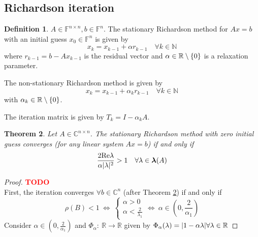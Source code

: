 \documentclass[12pt]{article}
\newcounter{lecture}
\newtheorem{theorem}{Theorem}[lecture]
\theoremstyle{definition}
\newtheorem{definition}[theorem]{Definition}
\theoremstyle{remark}
\numberwithin{equation}{section}
\newcommand{\F}{\mathbb{F}}
\newcommand{\R}{\mathbb{R}}
\newcommand{\C}{\mathbb{C}}
\newcommand{\N}{\mathbb{N}}
\renewcommand{\Re}{\textnormal{Re}}
\newcommand{\spectrum}[1]{\bm{\lambda}(#1)}
\newcommand{\TODO}[1][]{\textcolor{red}{\textbf{TODO\ifblank{#1}{}{:\ }#1}}\\}
\DeclarePairedDelimiter{\set}{\{}{\}}
\DeclarePairedDelimiter{\abs}{\lvert}{\rvert}
\begin{document}
\subsection*{Richardson iteration}
\begin{definition}
  $A \in \F^{n\times n}, b \in \F^n$. The stationary Richardson method for $Ax=b$ with an initial guess $x_0 \in \F^n$ is given by
  \begin{equation*}
    x_k = x_{k-1} + \alpha r_{k-1} \quad \forall k \in \N
  \end{equation*}
  where $r_{k-1} = b - Ax_{k-1}$ is the residual vector and $\alpha \in \R\setminus\set{0}$ is a relaxation parameter.

  The non-stationary Richardson method is given by
  \begin{equation*}
    x_k = x_{k-1} + \alpha_k r_{k-1} \quad \forall k \in \N
  \end{equation*}
  with $\alpha_k \in \R\setminus\set{0}$.

  The iteration matrix is given by $T_k = I - \alpha_k A$.
\end{definition}
\begin{theorem}
  \label{thm:5.7}
  Let $A \in \C^{n\times n}$. The stationary Richardson method with zero initial guess converges (for any linear system $Ax = b$) if and only if
  \begin{equation*}
    \frac{2 \Re \lambda}{\alpha |\lambda|^2} > 1 \quad \forall \lambda \in \spectrum{A}
  \end{equation*}
\end{theorem}
\begin{proof}
  \TODO
  First, the iteration converges $\forall b \in \C^n$ (after Theorem \ref{thm:5.7}) if and only if
  \begin{equation*}
    \rho(B) < 1\ \Leftrightarrow\
    \begin{cases}
      \alpha > 0 \\ \alpha < \frac{2}{\lambda_1}
    \end{cases}
    \Leftrightarrow\ \alpha \in (0, \frac{2}{\alpha_1})
  \end{equation*}
  Consider $\alpha \in (0, \frac{2}{\alpha_1})$ and $\Phi_\alpha:\ \R \rightarrow \R$ given by $\Phi_\alpha(\lambda) = \abs{1 - \alpha \lambda} \forall \lambda \in \R$
\end{proof}
\end{document}
